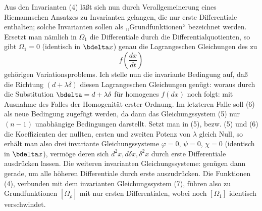 Aus den Invarianten (4) läßt sich nun durch Verallgemeinerung eines
Riemannschen Ansatzes zu Invarianten gelangen, die nur erste
Differentiale enthalten; solche Invarianten sollen als
,,Grundfunktionen`` bezeichnet werden. Ersetzt man nämlich in
\(\Omega_1\) die Differentiale durch die Differentialquotienten, so gibt
\(\Omega_1=0\) (identisch in \(\bdelta x\)) genau die Lagrangeschen
Gleichungen des zu
\[
f\!\left(\frac{dx}{dt}\right)
\]
gehörigen Variationsproblems. Ich stelle nun die invariante Bedingung
auf, daß die Richtung \((d+\lambda\delta)\) diesen Lagrangeschen
Gleichungen genügt:
woraus durch die Substitution \(\bdelta=d+\lambda\delta\) für
homogenes \(f(dx)\) noch folgt:
mit Ausnahme des Falles der Homogenität erster Ordnung. Im letzteren
Falle soll (6) als neue Bedingung zugefügt werden, da dann das
Gleichungssystem (5) nur \((n-1)\) unabhängige Bedingungen darstellt.
Setzt man in (5), bezw. (5) und (6) die Koeffizienten der nullten,
ersten und zweiten Potenz von \(\lambda\) gleich Null, so erhält man
also drei invariante Gleichungssysteme
\(\varphi=0\), \(\psi=0\), \(\chi=0\) (identisch in \(\bdelta x\)),
vermöge deren sich \(d^2x,d\delta x,\delta^2x\) durch erste Differentiale
ausdrücken lassen. Die weiteren invarianten Gleichungssysteme:
genügen dann gerade, um alle höheren Differentiale durch erste
auszudrücken. Die Funktionen (4), verbunden mit dem
invarianten Gleichungssystem (7), führen also zu Grundfunktionen
\([\Omega_\rho]\) mit nur ersten Differentialen, wobei noch
\([\Omega_1]\) identisch verschwindet.

